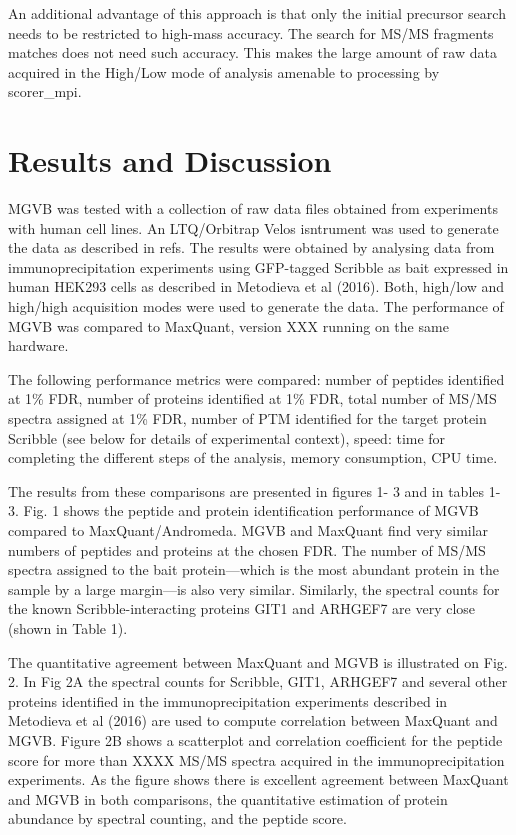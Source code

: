 \documentclass[sn-standardnature]{sn-jnl}%
\theoremstyle{thmstyleone}%
\theoremstyle{thmstyletwo}%
\theoremstyle{thmstylethree}%
\begin{document}
An additional advantage of this approach is that only the initial precursor search needs to be restricted to high-mass accuracy. The search for MS/MS fragments matches does not need such accuracy. This makes the large amount of raw data acquired in the High/Low mode of analysis amenable to processing by scorer\_mpi.

\section{Results and Discussion}\label{sec2}

MGVB was tested with a collection of raw data files obtained from experiments with human cell lines. An LTQ/Orbitrap Velos isntrument was used to generate the data as described in refs. The results were obtained by analysing data from immunoprecipitation experiments using GFP-tagged Scribble as bait expressed in human HEK293 cells as described in Metodieva et al (2016). Both, high/low and high/high acquisition modes were used to generate the data. The performance of MGVB was compared to MaxQuant, version XXX running on the same hardware. 

The following performance metrics were compared: number of peptides identified at 1\% FDR, number of proteins identified at  1\% FDR, total number of MS/MS spectra assigned at 1\% FDR, number of PTM identified for the target protein Scribble (see below for details of experimental context), speed: time for completing the different steps of the analysis, memory consumption, CPU time. 

The results from these comparisons are presented in figures 1- 3 and in tables 1- 3. Fig. 1 shows the peptide and protein identification performance of MGVB compared to MaxQuant/Andromeda. MGVB and MaxQuant find very similar numbers of peptides and proteins at the chosen FDR. The number of MS/MS spectra assigned to the bait protein—which is the most abundant protein in the sample by a large margin—is also very similar. Similarly, the spectral counts for the known Scribble-interacting proteins GIT1 and ARHGEF7 are very close (shown in Table 1).  

The quantitative agreement between MaxQuant and MGVB is illustrated on Fig. 2. In Fig 2A the spectral counts for Scribble, GIT1, ARHGEF7 and several other proteins identified in the immunoprecipitation experiments described in Metodieva et al (2016) are used to compute correlation between MaxQuant and MGVB.  Figure 2B shows a scatterplot and correlation coefficient for the peptide score for more than XXXX MS/MS spectra acquired in the immunoprecipitation experiments. As the figure shows there is excellent agreement between MaxQuant and MGVB in both comparisons, the quantitative estimation of protein abundance by spectral counting, and the peptide score.
\end{document}
